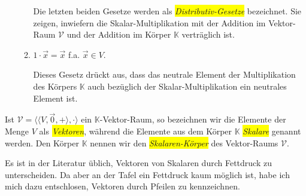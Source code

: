 \begin{Definition}
\begin{enumerate}
\begin{enumerate}
            Die letzten beiden Gesetze werden als \colorbox{yellow}{\emph{Distributiv-Gesetze}}
            bezeichnet.  Sie zeigen, inwiefern die Skalar-Multiplikation mit der Addition im Vektor-Raum
            $\mathcal{V}$ und der Addition im K\"{o}rper $\mathbb{K}$ vertr\"{a}glich ist.
      \item $1 \cdot \vec{x} = \vec{x}$ \quad f.a. $\vec{x} \in V$.  

            Dieses Gesetz dr\"{u}ckt aus, dass das neutrale Element der Multiplikation des K\"{o}rpers
            $\mathbb{K}$ auch bez\"{u}glich der Skalar-Multiplikation ein neutrales Element ist. 
      \end{enumerate}
\end{enumerate} 
Ist $\mathcal{V} = \bigl\langle \langle V, \vec{0}, + \rangle, \cdot \bigr\rangle$  ein $\mathbb{K}$-Vektor-Raum, so bezeichnen wir die Elemente der Menge
$V$ als \colorbox{yellow}{\emph{Vektoren}}, w\"{a}hrend die Elemente aus dem K\"{o}rper $\mathbb{K}$ 
\colorbox{yellow}{\emph{Skalare}} genannt werden.  Den K\"{o}rper $\mathbb{K}$ nennen wir den
\colorbox{yellow}{\emph{Skalaren-K\"{o}rper}} des Vektor-Raums $\mathcal{V}$.  
\eoxs
\end{Definition}

\remark
Es ist in der Literatur \"{u}blich, Vektoren von Skalaren durch Fettdruck zu unterscheiden.  
Da aber an der Tafel ein Fettdruck kaum m\"{o}glich ist, habe ich mich dazu entschlosen, 
Vektoren durch Pfeilen zu kennzeichnen.
\eoxs


